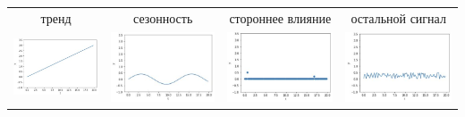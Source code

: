\documentclass[fullscreen=true, bookmarks=true, hyperref={pdfencoding=unicode}]{beamer}
\begin{document}
\begin{frame}
  \begin{tabular}{cccc}
    тренд \hfill & сезонность & стороннее влияние & остальной сигнал \\
    \hspace{-1.2cm}
    \includegraphics[keepaspectratio,
                   width=.2\paperwidth]{trend.jpg}
    &
    \includegraphics[keepaspectratio,
                   width=.2\paperwidth]{season.jpg}
    &
    \includegraphics[keepaspectratio,
                   width=.2\paperwidth]{site_impact.jpg}
    &
    \includegraphics[keepaspectratio,
                   width=.2\paperwidth]{other_signal.jpg}
  \end{tabular}
\end{frame}
\end{document}
